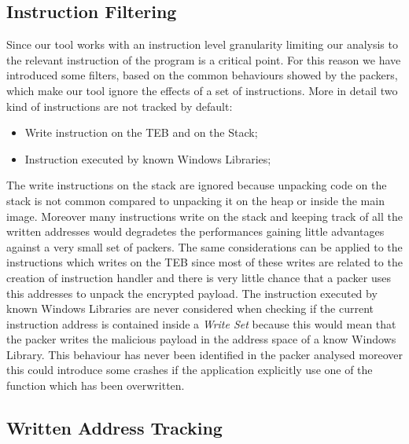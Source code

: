 \subsection{Instruction Filtering}
Since our tool works with an instruction level granularity limiting our analysis to the relevant instruction of the program is a critical point. For this reason we have introduced some filters, based on the common behaviours showed by the packers, which make our tool ignore the effects of a set of instructions. More in detail two kind of instructions are not tracked by default:
\begin{itemize}
	\item Write instruction on the TEB and on the Stack;
	\item Instruction executed by known Windows Libraries;
\end{itemize}
 The write instructions on the stack are ignored because unpacking code on the stack is not common compared to unpacking it on the heap or inside the main image. Moreover many instructions write on the stack and keeping track of all the written addresses would degradetes the performances gaining little advantages against a very small set of packers. The same considerations can be applied to the instructions which writes on the TEB since most of these writes are related to the creation of instruction handler and there is very little chance that a packer uses this addresses to unpack the encrypted payload.
The instruction executed by known Windows Libraries are never considered when checking if the current instruction address is contained inside a \textit{Write Set } because this would mean that the packer writes the malicious payload in the address space of a know Windows Library. This behaviour has never been identified in the packer analysed moreover this could introduce some crashes if the application explicitly use one of the function which has been overwritten.
\subsection{Written Address Tracking}


